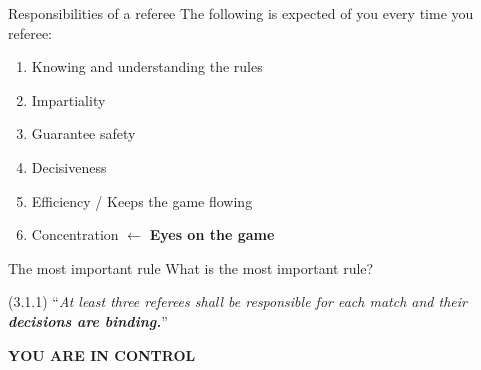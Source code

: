 \begin{frame}{Responsibilities of a referee}
    The following is expected of you every time you referee: \pause{}

    \begin{enumerate}
        \item Knowing and understanding the rules \pause{}
        \item Impartiality \pause{}
        \item Guarantee safety \pause{}
        \item Decisiveness \pause{}
        \item Efficiency / Keeps the game flowing \pause{}
        \item Concentration \pause{} $\leftarrow$ \textbf{Eyes on the game}
    \end{enumerate}
\end{frame}

\begin{frame}{The most important rule}
    What is the most important rule?

    \vspace{0.75cm}

    \pause{}

    (3.1.1) ``\textit{At least three referees shall be responsible for each match and their \textbf{decisions are
            binding.}}''

    \pause{}

    \begin{center}
        \textbf{\uppercase{You are in control}}
    \end{center}
\end{frame}